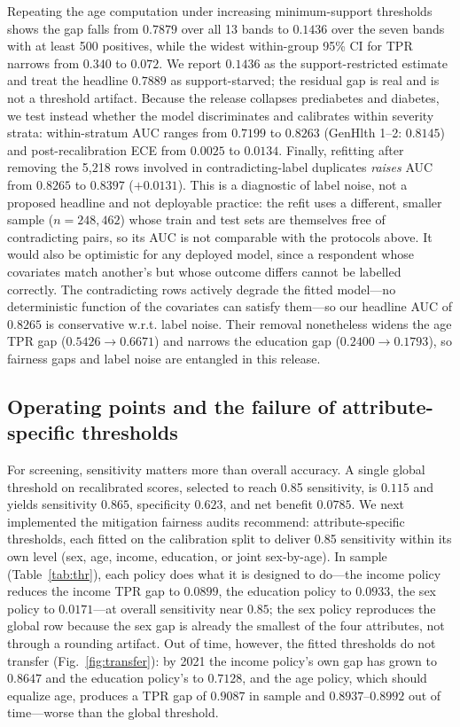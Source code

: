 \documentclass[conference]{IEEEtran}
\begin{document}
Repeating the age computation under increasing minimum-support thresholds shows the gap falls from $0.7879$ over all 13 bands to $0.1436$ over the seven bands with at least 500 positives, while the widest within-group 95\% CI for TPR narrows from $0.340$ to $0.072$. We report $0.1436$ as the support-restricted estimate and treat the headline $0.7889$ as support-starved; the residual gap is real and is not a threshold artifact. Because the release collapses prediabetes and diabetes, we test instead whether the model discriminates and calibrates within severity strata: within-stratum AUC ranges from $0.7199$ to $0.8263$ (GenHlth 1--2: $0.8145$) and post-recalibration ECE from $0.0025$ to $0.0134$. Finally, refitting after removing the 5{,}218 rows involved in contradicting-label duplicates \emph{raises} AUC from $0.8265$ to $0.8397$ ($+0.0131$). This is a diagnostic of label noise, not a proposed headline and not deployable practice: the refit uses a different, smaller sample ($n = 248{,}462$) whose train and test sets are themselves free of contradicting pairs, so its AUC is not comparable with the protocols above. It would also be optimistic for any deployed model, since a respondent whose covariates match another's but whose outcome differs cannot be labelled correctly. The contradicting rows actively degrade the fitted model---no deterministic function of the covariates can satisfy them---so our headline AUC of $0.8265$ is conservative w.r.t. label noise. Their removal nonetheless widens the age TPR gap ($0.5426 \rightarrow 0.6671$) and narrows the education gap ($0.2400 \rightarrow 0.1793$), so fairness gaps and label noise are entangled in this release.

\subsection{Operating points and the failure of attribute-specific thresholds}
For screening, sensitivity matters more than overall accuracy. A single global threshold on recalibrated scores, selected to reach 0.85 sensitivity, is $0.115$ and yields sensitivity $0.865$, specificity $0.623$, and net benefit $0.0785$. We next implemented the mitigation fairness audits recommend: attribute-specific thresholds, each fitted on the calibration split to deliver 0.85 sensitivity within its own level (sex, age, income, education, or joint sex-by-age). In sample (Table~\ref{tab:thr}), each policy does what it is designed to do---the income policy reduces the income TPR gap to $0.0899$, the education policy to $0.0933$, the sex policy to $0.0171$---at overall sensitivity near $0.85$; the sex policy reproduces the global row because the sex gap is already the smallest of the four attributes, not through a rounding artifact. Out of time, however, the fitted thresholds do not transfer (Fig.~\ref{fig:transfer}): by 2021 the income policy's own gap has grown to $0.8647$ and the education policy's to $0.7128$, and the age policy, which should equalize age, produces a TPR gap of $0.9087$ in sample and $0.8937$--$0.8992$ out of time---worse than the global threshold.
\end{document}
